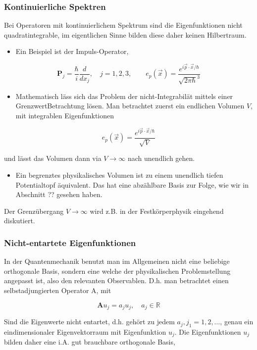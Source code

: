 \documentclass[10pt, letterpaper]{article}
\begin{document}
\subsubsection*{Kontinuierliche Spektren}
Bei Operatoren mit kontinuierlichem Spektrum sind die Eigenfunktionen nicht quadratintegrable, im eigentlichen Sinne bilden diese daher keinen Hilbertraum.

\begin{itemize}
  \item Ein Beispiel ist der Impuls-Operator,
\end{itemize}

$$
\mathbf{P}_{j}=\frac{\hbar}{i} \frac{d}{d x_{j}}, \quad j=1,2,3, \quad \quad e_{p}(\vec{x})=\frac{e^{i \vec{p} \cdot \vec{x} / \hbar}}{\sqrt{2 \pi \hbar}^{3}}
$$

\begin{itemize}
  \item Mathematisch läss sich das Problem der nicht-Integrabilät mittels einer GrenzwertBetrachtung lösen. Man betrachtet zuerst ein endlichen Volumen $V$, mit integrablen Eigenfunktionen
\end{itemize}

$$
e_{p}(\vec{x})=\frac{e^{i \vec{p} \cdot \vec{x} / \hbar}}{\sqrt{V}}
$$

und lässt das Volumen dann via $V \rightarrow \infty$ nach unendlich gehen.

\begin{itemize}
  \item Ein begrenztes physikalisches Volumen ist zu einem unendlich tiefen Potentialtopf äquivalent. Das hat eine abzählbare Basis zur Folge, wie wir in Abschnitt ?? gesehen haben.
\end{itemize}

Der Grenzübergang $V \rightarrow \infty$ wird z.B. in der Festkörperphysik eingehend diskutiert.

\subsubsection*{Nicht-entartete Eigenfunktionen}
In der Quantenmechanik benutzt man im Allgemeinen nicht eine beliebige orthogonale Basis, sondern eine welche der physikalischen Problemstellung angepasst ist, also den relevanten Observablen. D.h. man betrachtet einen selbstadjungierten Operator A, mit

$$
\mathbf{A} u_{j}=a_{j} u_{j}, \quad a_{j} \in \mathbb{R}
$$

Sind die Eigenwerte nicht entartet, d.h. gehört zu jedem $a_{j}, j_{1}=1,2, \ldots$, genau ein eindimensionaler Eigenvektorraum mit Eigenfunktion $u_{j}$. Die Eigenfunktionen $u_{j}$ bilden daher eine i.A. gut brauchbare orthogonale Basis,
\end{document}
